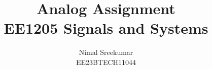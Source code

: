 \documentclass[a4,12pt,onecolumn]{IEEEtran}
\begin{document}
\let\vec\mathbf

\title{
\Huge\textbf{Analog Assignment}\\
\Huge\textbf{EE1205} Signals and Systems\\
}
\large\author{Nimal Sreekumar\\EE23BTECH11044}

\maketitle



\bigskip

\renewcommand{\thefigure}{\theenumi}
\renewcommand{\thetable}{\theenumi}
\end{document}
